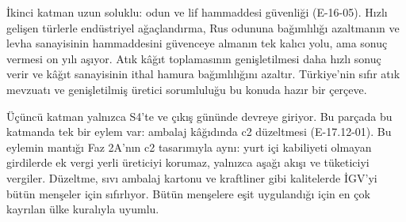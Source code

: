 İkinci katman uzun soluklu: odun ve lif hammaddesi güvenliği (E-16-05). Hızlı gelişen türlerle endüstriyel ağaçlandırma, Rus odununa bağımlılığı azaltmanın ve levha sanayisinin hammaddesini güvenceye almanın tek kalıcı yolu, ama sonuç vermesi on yılı aşıyor. Atık kâğıt toplamasının genişletilmesi daha hızlı sonuç verir ve kâğıt sanayisinin ithal hamura bağımlılığını azaltır. Türkiye'nin sıfır atık mevzuatı ve genişletilmiş üretici sorumluluğu bu konuda hazır bir çerçeve.

Üçüncü katman yalnızca S4'te ve çıkış gününde devreye giriyor. Bu parçada bu katmanda tek bir eylem var: ambalaj kâğıdında c2 düzeltmesi (E-17.12-01). Bu eylemin mantığı Faz 2A'nın c2 tasarımıyla aynı: yurt içi kabiliyeti olmayan girdilerde ek vergi yerli üreticiyi korumaz, yalnızca aşağı akışı ve tüketiciyi vergiler. Düzeltme, sıvı ambalaj kartonu ve kraftliner gibi kalitelerde İGV'yi bütün menşeler için sıfırlıyor. Bütün menşelere eşit uygulandığı için en çok kayrılan ülke kuralıyla uyumlu.

